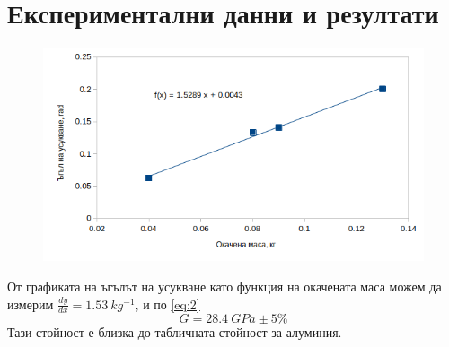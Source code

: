 \documentclass[aps, prb, twocolumn, a4paper, floatfix, reprint]{revtex4-2}
\begin{document}
\section{Експериментални данни и резултати}

\begin{figure}[H]
    \includegraphics[width=0.9\columnwidth, keepaspectratio=true]{angle_vs_mass_chart.png}
\end{figure}

От графиката на ъгълът на усукване като функция на окачената маса можем да измерим $\frac{dy}{dx} = 1.53 \ kg^{-1}$, и по \eqref{eq:2} 
\begin{equation}
    G = 28.4 \ GPa \pm 5\%
\end{equation}
Тази стойност е близка до табличната стойност за алуминия. 
\end{document}

